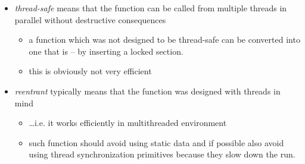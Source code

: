 \begin{slide}

\begin{itemize}
\item \emph{thread-safe} means that the function can be called from multiple
threads in parallel without destructive consequences
\begin{itemize}
\item a function which was not designed to be thread-safe can be
converted into one that is -- by inserting a locked section.
\item this is obviously not very efficient
\end{itemize}
\item \emph{reentrant} typically means that the function was designed
with threads in mind
\begin{itemize}
\item \dots{}i.e. it works efficiently in multithreaded environment
\item such function should avoid using static data and if possible also
avoid using thread synchronization primitives because they slow down 
the run.
\end{itemize}
\end{itemize}
\end{slide}

\label{THREADSAFE}

